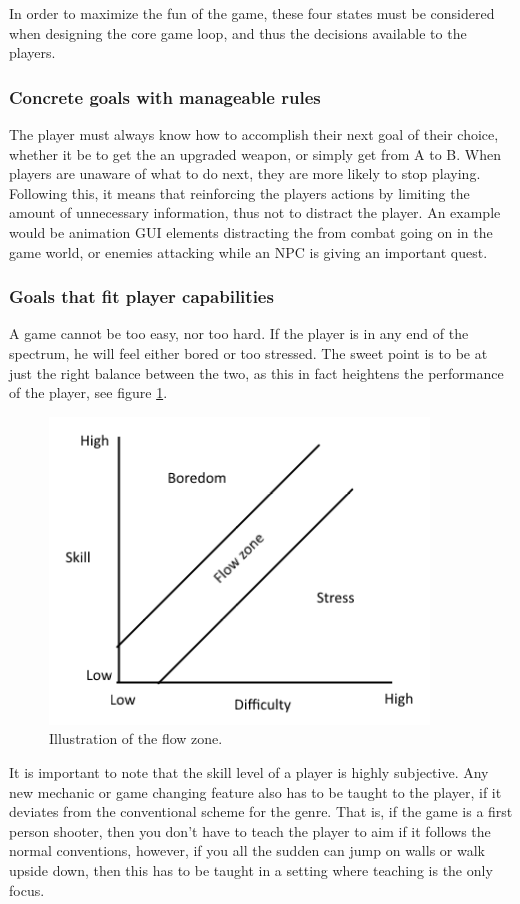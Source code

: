 In order to maximize the fun of the game, these four states must be considered when designing the core game loop, and thus the decisions available to the players.

\subsubsection{Concrete goals with manageable rules}
The player must always know how to accomplish their next goal of their choice, whether it be to get the an upgraded weapon, or simply get from A to B.
When players are unaware of what to do next, they are more likely to stop playing.
Following this, it means that reinforcing the players actions by limiting the amount of unnecessary information, thus not to distract the player.
An example would be animation GUI elements distracting the from combat going on in the game world, or enemies attacking while an NPC is giving an important quest.

\subsubsection{Goals that fit player capabilities}
A game cannot be too easy, nor too hard. If the player is in any end of the spectrum, he will feel either bored or too stressed.
The sweet point is to be at just the right balance between the two, as this in fact heightens the performance of the player, see figure \ref{gamedesign:flowzone}.
\begin{figure}
    \includegraphics{figures/gamedesign/flowZone}
    \caption{Illustration of the flow zone.}
    \label{gamedesign:flowzone}
\end{figure}

It is important to note that the skill level of a player is highly subjective.
Any new mechanic or game changing feature also has to be taught to the player, if it deviates from the
conventional scheme for the genre. 
That is, if the game is a first person shooter, then you don't have to teach the player to aim if it follows the normal conventions, however, if you all the sudden can jump on walls or walk upside down, then this has to be taught in a setting where teaching is the only focus.

